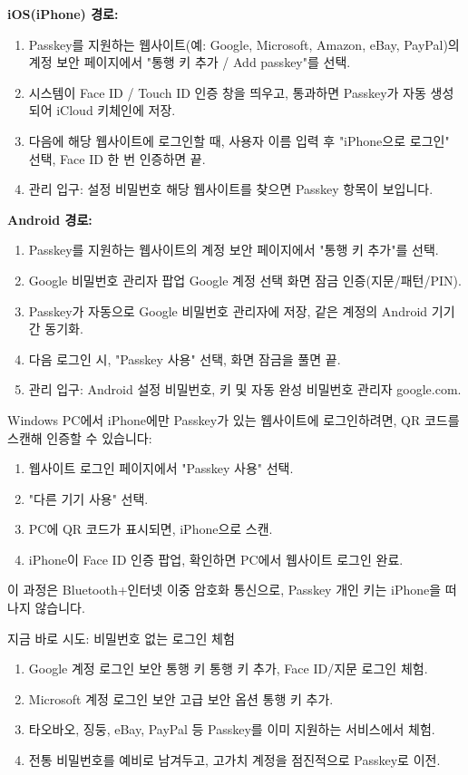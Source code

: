 \textbf{iOS(iPhone) 경로:}

\begin{enumerate}
  \item Passkey를 지원하는 웹사이트(예: Google, Microsoft, Amazon, eBay, PayPal)의 계정 보안 페이지에서 "통행 키 추가 / Add passkey"를 선택.
  \item 시스템이 Face ID / Touch ID 인증 창을 띄우고, 통과하면 Passkey가 자동 생성되어 iCloud 키체인에 저장.
  \item 다음에 해당 웹사이트에 로그인할 때, 사용자 이름 입력 후 "iPhone으로 로그인" 선택, Face ID 한 번 인증하면 끝.
  \item 관리 입구: 설정 비밀번호 해당 웹사이트를 찾으면 Passkey 항목이 보입니다.
\end{enumerate}

\textbf{Android 경로:}

\begin{enumerate}
  \item Passkey를 지원하는 웹사이트의 계정 보안 페이지에서 "통행 키 추가"를 선택.
  \item Google 비밀번호 관리자 팝업 Google 계정 선택 화면 잠금 인증(지문/패턴/PIN).
  \item Passkey가 자동으로 Google 비밀번호 관리자에 저장, 같은 계정의 Android 기기 간 동기화.
  \item 다음 로그인 시, "Passkey 사용" 선택, 화면 잠금을 풀면 끝.
  \item 관리 입구: Android 설정 비밀번호, 키 및 자동 완성 비밀번호 관리자 google.com.
\end{enumerate}


Windows PC에서 iPhone에만 Passkey가 있는 웹사이트에 로그인하려면, QR 코드를 스캔해 인증할 수 있습니다:

\begin{enumerate}
  \item 웹사이트 로그인 페이지에서 "Passkey 사용" 선택.
  \item "다른 기기 사용" 선택.
  \item PC에 QR 코드가 표시되면, iPhone으로 스캔.
  \item iPhone이 Face ID 인증 팝업, 확인하면 PC에서 웹사이트 로그인 완료.
\end{enumerate}

이 과정은 Bluetooth+인터넷 이중 암호화 통신으로, Passkey 개인 키는 iPhone을 떠나지 않습니다.

\begin{tcbpractice}{지금 바로 시도: 비밀번호 없는 로그인 체험}
\begin{enumerate}
  \item Google 계정 로그인 보안 통행 키 통행 키 추가, Face ID/지문 로그인 체험.
  \item Microsoft 계정 로그인 보안 고급 보안 옵션 통행 키 추가.
  \item 타오바오, 징둥, eBay, PayPal 등 Passkey를 이미 지원하는 서비스에서 체험.
  \item 전통 비밀번호를 예비로 남겨두고, 고가치 계정을 점진적으로 Passkey로 이전.
\end{enumerate}

\end{tcbpractice}

